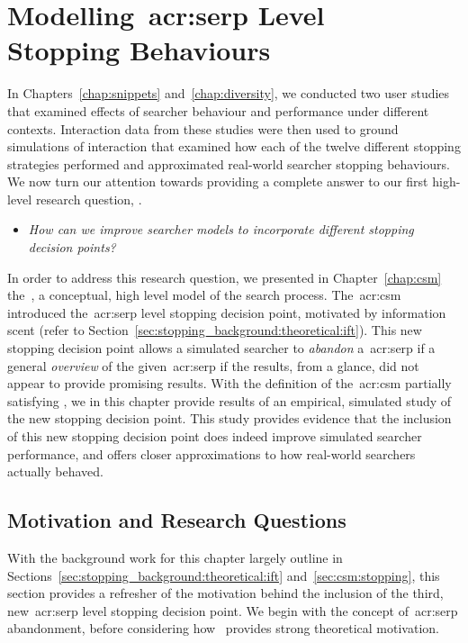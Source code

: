 
\chapter[Modelling SERP Level Stopping Behaviours]{Modelling~\gls{acr:serp} Level\\Stopping Behaviours}\label{chap:serp}
In Chapters~\ref{chap:snippets} and~\ref{chap:diversity}, we conducted two user studies that examined effects of searcher behaviour and performance under different contexts. Interaction data from these studies were then used to ground simulations of interaction that examined how each of the twelve different stopping strategies performed and approximated real-world searcher stopping behaviours. We now turn our attention towards providing a complete answer to our first high-level research question, .

\begin{itemize}
    \item[]{ \emph{How can we improve searcher models to incorporate different stopping decision points?}}
\end{itemize}

In order to address this research question, we presented in Chapter~\ref{chap:csm} the~, a conceptual, high level model of the search process. The~\gls{acr:csm} introduced the~\gls{acr:serp} level stopping decision point, motivated by information scent (refer to Section~\ref{sec:stopping_background:theoretical:ift}). This new stopping decision point allows a simulated searcher to \emph{abandon} a~\gls{acr:serp} if a general \emph{overview} of the given~\gls{acr:serp} if the results, from a glance, did not appear to provide promising results. With the definition of the~\gls{acr:csm} partially satisfying , we in this chapter provide results of an empirical, simulated study of the new stopping decision point. This study provides evidence that the inclusion of this new stopping decision point does indeed improve simulated searcher performance, and offers closer approximations to how real-world searchers actually behaved.

\section{Motivation and Research Questions}\label{sec:serp:background}
With the background work for this chapter largely outline in Sections~\ref{sec:stopping_background:theoretical:ift} and~\ref{sec:csm:stopping}, this section provides a refresher of the motivation behind the inclusion of the third, new~\gls{acr:serp} level stopping decision point. We begin with the concept of~\gls{acr:serp} abandonment, before considering how~ provides strong theoretical motivation.

